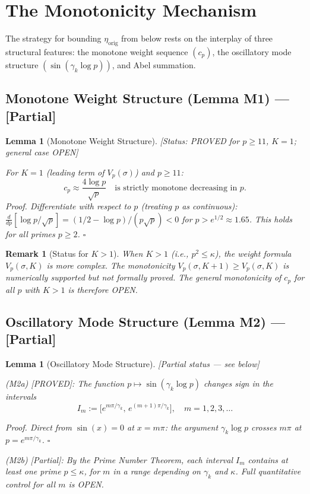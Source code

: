 \documentclass[11pt]{article}
\newtheorem{lemma}[theorem]{Lemma}
\newtheorem*{remark}{Remark}
\newcommand{\etaorig}{\eta_{\mathrm{orig}}}
\begin{document}
\section{The Monotonicity Mechanism}

The strategy for bounding $\etaorig$ from below rests on the
interplay of three structural features:
the monotone weight sequence $(c_p)$,
the oscillatory mode structure $(\sin(\gamma_k\log p))$,
and Abel summation.

\subsection{Monotone Weight Structure (Lemma M1) --- [Partial]}

\begin{lemma}[Monotone Weight Structure]\label{lem:M1}
\emph{[Status: PROVED for $p\geq 11$, $K=1$; general case OPEN]}

For $K=1$ (leading term of $V_p(\sigma)$) and $p\geq 11$:
\[
c_p \approx \frac{4\log p}{\sqrt{p}}\quad\text{is strictly monotone
decreasing in } p.
\]
\emph{Proof.}
Differentiate with respect to $p$ (treating $p$ as continuous):
$\frac{d}{dp}[\log p/\sqrt{p}] = (1/2-\log p)/(p\sqrt{p}) < 0$
for $p > e^{1/2}\approx 1.65$.
This holds for all primes $p\geq 2$. $\square$
\end{lemma}

\begin{remark}[Status for $K>1$]
When $K>1$ (i.e., $p^2\leq\kappa$), the weight formula $V_p(\sigma,K)$
is more complex.
The monotonicity $V_p(\sigma,K+1)\geq V_p(\sigma,K)$ is numerically
supported but not formally proved.
The general monotonicity of $c_p$ for all $p$ with $K>1$ is therefore
OPEN.
\end{remark}

\subsection{Oscillatory Mode Structure (Lemma M2) --- [Partial]}

\begin{lemma}[Oscillatory Mode Structure]\label{lem:M2}
\emph{[Partial status --- see below]}

\emph{(M2a) [PROVED]:}
The function $p\mapsto\sin(\gamma_k\log p)$ changes sign in the
intervals
\[
I_m := \bigl[e^{m\pi/\gamma_k},\, e^{(m+1)\pi/\gamma_k}\bigr],
\quad m = 1,2,3,\ldots
\]

\emph{Proof.}
Direct from $\sin(x)=0$ at $x=m\pi$: the argument
$\gamma_k\log p$ crosses $m\pi$ at $p = e^{m\pi/\gamma_k}$. $\square$

\emph{(M2b) [Partial]:}
By the Prime Number Theorem, each interval $I_m$ contains at least
one prime $p\leq\kappa$, for $m$ in a range depending on $\gamma_k$
and $\kappa$.
Full quantitative control for all $m$ is OPEN.
\end{lemma}
\end{document}
